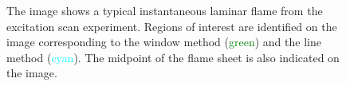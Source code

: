 \begin{figure}

\centering



\caption[Processing of the excitation scan images]{The image shows a typical instantaneous laminar flame from the excitation scan experiment. Regions of interest are identified on the image corresponding to the window method (\textcolor{green}{green}) and the line method (\textcolor{cyan}{cyan}). The midpoint of the flame sheet is also indicated on the image.}

\label{fig:excitationScanFlame}

\end{figure}

